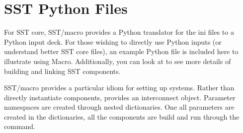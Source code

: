 
\section{SST Python Files}
\label{sec:pythonFiles}
For SST core, SST/macro provides a Python translator for the ini files to a Python input deck.
For those wishing to directly use Python inputs (or understand better SST core files),
an example Python file is included here to illustrate using Macro.
Additionally, you can look at  to see more details of building and linking SST components.

SST/macro provides a particular idiom for setting up systems.
Rather than directly instantiate components,  provides an interconnect object.
Parameter namespaces are created through nested dictionaries.
One all parameters are created in the dictionaries, all the components are build and run through the  command.


